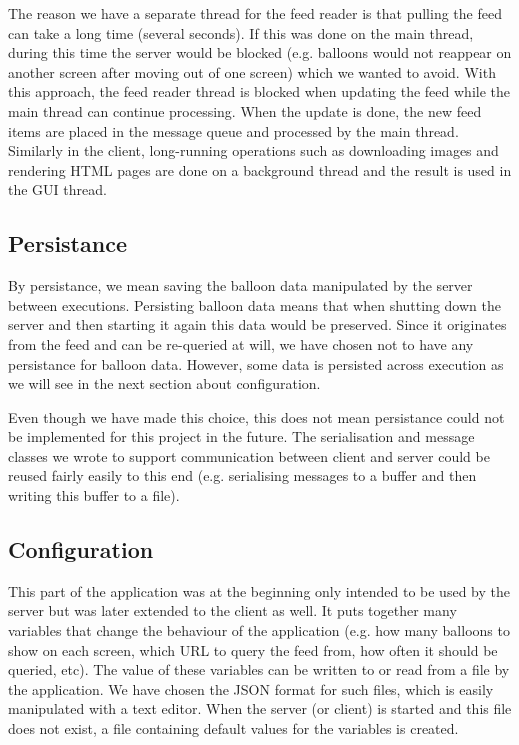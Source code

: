 The reason we have a separate thread for the feed reader is that pulling the 
feed can take a long time (several seconds). If this was done on the main 
thread, during this time the server would be blocked (e.g. balloons would not 
reappear on another screen after moving out of one screen) which we wanted to 
avoid. With this approach, the feed reader thread is blocked when updating the
feed while the main thread can continue processing. When the update is done, the
new feed items are placed in the message queue and processed by the main thread.
Similarly in the client, long-running operations such as downloading images and 
rendering HTML pages are done on a background thread and the result is used in 
the GUI thread.

\clearpage{}
\subsection{Persistance}

By persistance, we mean saving the balloon data manipulated by the server between 
executions. Persisting balloon data means that when shutting down the 
server and then starting it again this data would be preserved. Since it 
originates from the feed and can be re-queried at will, we have chosen not to
have any persistance for balloon data. However, some data is persisted across 
execution as we will see in the next section about configuration.

Even though we have made this choice, this does not mean persistance could not 
be implemented for this project in the future. The serialisation and message 
classes we wrote to support communication between client and server could be 
reused fairly easily to this end (e.g. serialising messages to a buffer and 
then writing this buffer to a file).

\subsection{Configuration}

This part of the application was at the beginning only intended to be used by 
the server but was later extended to the client as well. It puts together many 
variables that change the behaviour of the application (e.g. how many balloons 
to show on each screen, which URL to query the feed from, how often it  
should be queried, etc). The value of these variables can be written to or read 
from a file by the application. We have chosen the JSON format for such files, 
which is easily manipulated with a text editor. When the server (or client) is 
started and this file does not exist, a file containing default values for the 
variables is created.

